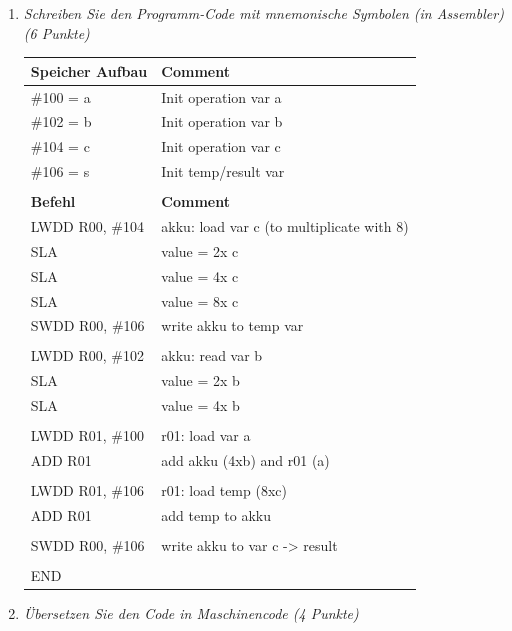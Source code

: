 \documentclass[10pt]{article}
\begin{document}
\begin{enumerate}[label=\alph*)]
	\item
		\textit{Schreiben Sie den Programm-Code mit mnemonische Symbolen (in Assembler) (6 Punkte)}
		
		\begin{tabular}[h]{l | l}
			\textbf{Speicher Aufbau} & \textbf{Comment}\\
			\hline
			\#100 = a & Init operation var a\\
			\#102 = b & Init operation var b\\
			\#104 = c & Init operation var c\\
			\#106 = s & Init temp/result var \\
			& \\
			\hline
			\textbf{Befehl} & \textbf{Comment}\\
			\hline
			LWDD R00, \#104 & akku: load var c (to multiplicate with 8)\\
			SLA & value = 2x c \\ %
			SLA & value = 4x c\\
			SLA & value = 8x c\\
			SWDD R00, \#106 & write akku to temp var\\
			& \\
			LWDD R00, \#102 & akku: read var b \\
			SLA & value = 2x b\\
			SLA & value = 4x b\\
			& \\
			LWDD R01, \#100 & r01: load var a\\ %
			ADD R01 & add akku (4xb) and r01 (a)\\
			& \\
			LWDD R01, \#106	 & r01: load temp (8xc) \\
			ADD R01 & add temp to akku \\
			& \\
			SWDD R00, \#106 & write akku to var c -> result\\
			& \\
			END & \\
			
		\end{tabular}

	\item
			\textit{Übersetzen Sie den Code in Maschinencode (4 Punkte)}
			

\end{enumerate}
\end{document}
